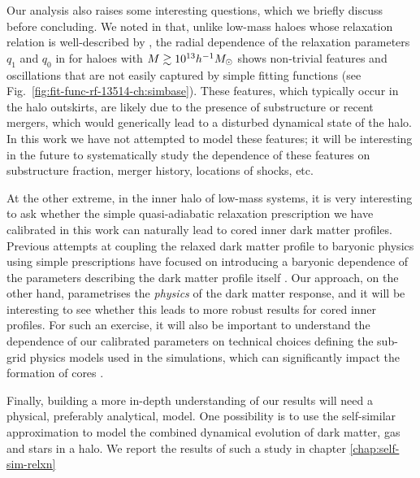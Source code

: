 Our analysis also raises some interesting questions, which we briefly discuss before concluding. We noted in  that, unlike low-mass haloes whose relaxation relation is well-described by , the radial dependence of the relaxation parameters $q_1$ and $q_0$ in  for haloes with $M\gtrsim10^{13}h^{-1}M_{\odot}$ shows non-trivial features and oscillations that are not easily captured by simple fitting functions (see Fig.~\ref{fig:fit-func-rf-13514-ch:simbase}). These features, which typically occur in the halo outskirts, are likely due to the presence of substructure or recent mergers, which would generically lead to a disturbed dynamical state of the halo. In this work we have not attempted to model these features; it will be interesting in the future to systematically study the dependence of these features on substructure fraction, merger history, locations of shocks, etc.

At the other extreme, in the inner halo of low-mass systems, it is very interesting to ask whether the simple quasi-adiabatic relaxation prescription we have calibrated in this work can naturally lead to cored inner dark matter profiles. Previous attempts at coupling the relaxed dark matter profile to baryonic physics using simple prescriptions have focused on introducing a baryonic dependence of the parameters describing the dark matter profile itself \citep[e.g.,][]{2014MNRAS.441.2986D}. Our approach, on the other hand, parametrises the \emph{physics} of the dark matter response, and it will be interesting to see whether this leads to more robust results for cored inner profiles. For such an exercise, it will also be important to understand the dependence of our calibrated parameters on technical choices defining the sub-grid physics models used in the simulations, which can significantly impact the formation of cores \citep{bfln18}. 

Finally, building a more in-depth understanding of our results will need a physical, preferably analytical, model. One possibility is to use the self-similar approximation \citep[][]{fg84,bertschinger85,launagai+15,shi16}
to model the combined dynamical evolution of dark matter, gas and stars in a halo.
We report the results of such a study in chapter \ref{chap:self-sim-relxn}

 
